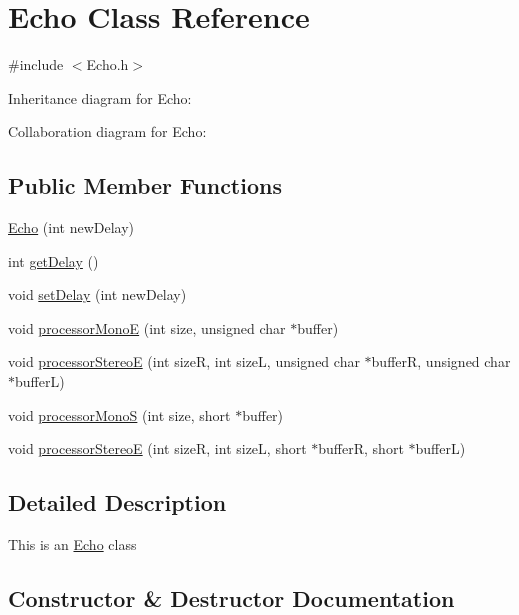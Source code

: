 \hypertarget{classEcho}{}\section{Echo Class Reference}
\label{classEcho}


{\ttfamily \#include $<$Echo.\+h$>$}



Inheritance diagram for Echo\+:


Collaboration diagram for Echo\+:
\subsection*{Public Member Functions}
\begin{DoxyCompactItemize}
\item 
\hyperlink{classEcho_a28d71de619dda9e6e51567a04bfb60d6}{Echo} (int new\+Delay)
\item 
int \hyperlink{classEcho_a57e19c9232f9bb96ccd78ba4bb68d6c9}{get\+Delay} ()
\item 
void \hyperlink{classEcho_a3096c57223d6f7ce3097d15e8bf4a0ed}{set\+Delay} (int new\+Delay)
\item 
void \hyperlink{classEcho_a472cc906604bcb493c6a6c1227436938}{processor\+MonoE} (int size, unsigned char $\ast$buffer)
\item 
void \hyperlink{classEcho_a92aa2d47f32f5ad0f2cd45121e8d457f}{processor\+StereoE} (int sizeR, int sizeL, unsigned char $\ast$bufferR, unsigned char $\ast$bufferL)
\item 
void \hyperlink{classEcho_a298f9fe12295c578737928544c46be1a}{processor\+MonoS} (int size, short $\ast$buffer)
\item 
void \hyperlink{classEcho_a5ac08be49218fd1a9e91a7d09aa889fc}{processor\+StereoE} (int sizeR, int sizeL, short $\ast$bufferR, short $\ast$bufferL)
\end{DoxyCompactItemize}


\subsection{Detailed Description}
This is an \hyperlink{classEcho}{Echo} class 

\subsection{Constructor \& Destructor Documentation}
\mbox{\label{classEcho_a28d71de619dda9e6e51567a04bfb60d6}} 
